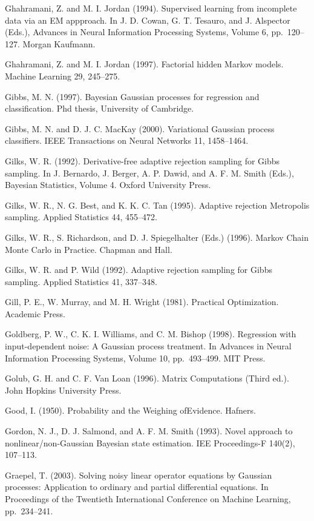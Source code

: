 \documentclass[
  10
]{article}
\begin{document}
Ghahramani, Z. and M. I. Jordan (1994). Supervised learning from
incomplete data via an EM appproach. In J. D. Cowan, G. T. Tesauro, and
J. Alspector (Eds.), Advances in Neural Information Processing Systems,
Volume 6, pp.~120--127. Morgan Kaufmann.

Ghahramani, Z. and M. I. Jordan (1997). Factorial hidden Markov models.
Machine Learning 29, 245--275.

Gibbs, M. N. (1997). Bayesian Gaussian processes for regression and
classification. Phd thesis, University of Cambridge.

Gibbs, M. N. and D. J. C. MacKay (2000). Variational Gaussian process
classifiers. IEEE Transactions on Neural Networks 11, 1458--1464.

Gilks, W. R. (1992). Derivative-free adaptive rejection sampling for
Gibbs sampling. In J. Bernardo, J. Berger, A. P. Dawid, and A. F. M.
Smith (Eds.), Bayesian Statistics, Volume 4. Oxford University Press.

Gilks, W. R., N. G. Best, and K. K. C. Tan (1995). Adaptive rejection
Metropolis sampling. Applied Statistics 44, 455--472.

Gilks, W. R., S. Richardson, and D. J. Spiegelhalter (Eds.) (1996).
Markov Chain Monte Carlo in Practice. Chapman and Hall.

Gilks, W. R. and P. Wild (1992). Adaptive rejection sampling for Gibbs
sampling. Applied Statistics 41, 337--348.

Gill, P. E., W. Murray, and M. H. Wright (1981). Practical Optimization.
Academic Press.

Goldberg, P. W., C. K. I. Williams, and C. M. Bishop (1998). Regression
with input-dependent noise: A Gaussian process treatment. In Advances in
Neural Information Processing Systems, Volume 10, pp.~493--499. MIT
Press.

Golub, G. H. and C. F. Van Loan (1996). Matrix Computations (Third ed.).
John Hopkins University Press.

Good, I. (1950). Probability and the Weighing ofEvidence. Hafners.

Gordon, N. J., D. J. Salmond, and A. F. M. Smith (1993). Novel approach
to nonlinear/non-Gaussian Bayesian state estimation. IEE Proceedings-F
140(2), 107--113.

Graepel, T. (2003). Solving noisy linear operator equations by Gaussian
processes: Application to ordinary and partial differential equations.
In Proceedings of the Twentieth International Conference on Machine
Learning, pp.~234--241.
\end{document}
